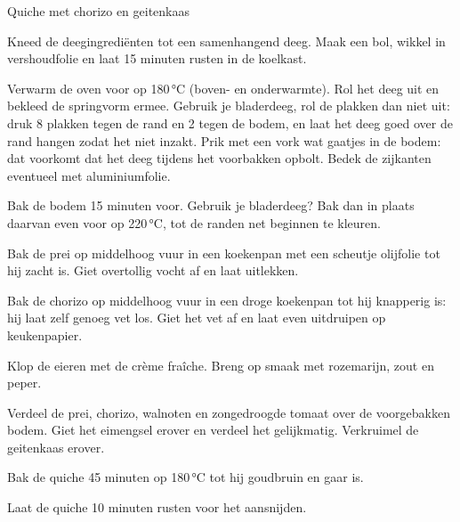 \begin{recipe}{Quiche met chorizo en geitenkaas}
\begin{steps}
  \item Kneed de deegingrediënten tot een samenhangend deeg. Maak een bol, wikkel
        in vershoudfolie en laat 15 minuten rusten in de koelkast.
  \item Verwarm de oven voor op 180\,°C (boven- en onderwarmte). Rol het deeg uit en bekleed de springvorm
        ermee. Gebruik je bladerdeeg, rol de plakken dan niet uit: druk 8
        plakken tegen de rand en 2 tegen de bodem, en laat het deeg goed over
        de rand hangen zodat het niet inzakt. Prik met een vork wat gaatjes
        in de bodem: dat voorkomt dat het deeg tijdens het voorbakken opbolt.
        Bedek de zijkanten eventueel met aluminiumfolie.
  \item Bak de bodem 15 minuten voor. Gebruik je bladerdeeg? Bak dan in
        plaats daarvan even voor op 220\,°C, tot de randen net beginnen te
        kleuren.
  \item Bak de prei op middelhoog vuur in een koekenpan met een scheutje olijfolie
        tot hij zacht is. Giet overtollig vocht af en laat uitlekken.
  \item Bak de chorizo op middelhoog vuur in een droge koekenpan tot hij knapperig
        is: hij laat zelf genoeg vet los. Giet het vet af en laat even uitdruipen op
        keukenpapier.
  \item Klop de eieren met de crème fraîche. Breng op smaak met rozemarijn, zout
        en peper.
  \item Verdeel de prei, chorizo, walnoten en zongedroogde tomaat over de
        voorgebakken bodem. Giet het eimengsel erover en verdeel het gelijkmatig.
        Verkruimel de geitenkaas erover.
  \item Bak de quiche 45 minuten op 180\,°C tot hij goudbruin en gaar is.
  \item Laat de quiche 10 minuten rusten voor het aansnijden.
\end{steps}

\end{recipe}
